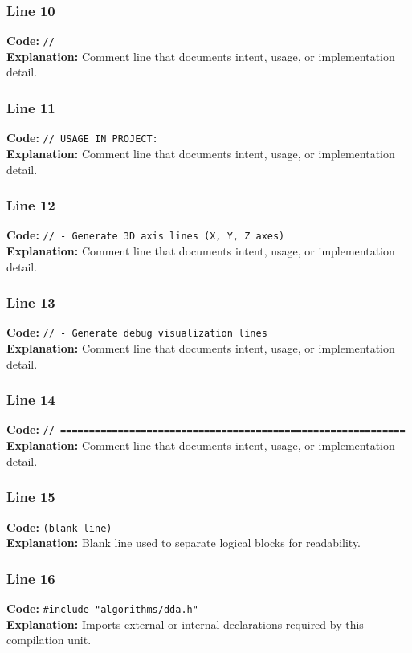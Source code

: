\documentclass[11pt,a4paper]{article}
\begin{document}
\subsubsection*{Line 10}
\textbf{Code:} \verb|//|\\
\textbf{Explanation:} Comment line that documents intent, usage, or implementation detail.

\subsubsection*{Line 11}
\textbf{Code:} \verb|// USAGE IN PROJECT:|\\
\textbf{Explanation:} Comment line that documents intent, usage, or implementation detail.

\subsubsection*{Line 12}
\textbf{Code:} \verb|// - Generate 3D axis lines (X, Y, Z axes)|\\
\textbf{Explanation:} Comment line that documents intent, usage, or implementation detail.

\subsubsection*{Line 13}
\textbf{Code:} \verb|// - Generate debug visualization lines|\\
\textbf{Explanation:} Comment line that documents intent, usage, or implementation detail.

\subsubsection*{Line 14}
\textbf{Code:} \verb|// ============================================================|\\
\textbf{Explanation:} Comment line that documents intent, usage, or implementation detail.

\subsubsection*{Line 15}
\textbf{Code:} \texttt{(blank line)}\\
\textbf{Explanation:} Blank line used to separate logical blocks for readability.

\subsubsection*{Line 16}
\textbf{Code:} \verb|#include "algorithms/dda.h"|\\
\textbf{Explanation:} Imports external or internal declarations required by this compilation unit.
\end{document}
